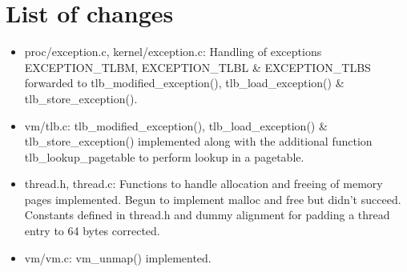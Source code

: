 \documentclass[11pt,a4paper]{article}
\begin{document}
\section{List of changes}
\begin{itemize}

    \item proc/exception.c, kernel/exception.c: Handling of exceptions
    EXCEPTION\_TLBM, EXCEPTION\_TLBL \& EXCEPTION\_TLBS forwarded to
    tlb\_modified\_exception(), tlb\_load\_exception() \&
    tlb\_store\_exception().

    \item vm/tlb.c: tlb\_modified\_exception(), tlb\_load\_exception() \&
    tlb\_store\_exception() implemented along with the additional function
    tlb\_lookup\_pagetable to perform lookup in a pagetable. 


    \item thread.h, thread.c: Functions to handle allocation and freeing of
    memory pages implemented. Begun to implement malloc and free but didn't
    succeed. Constants defined in thread.h and dummy alignment for padding a
    thread entry to 64 bytes corrected.

    \item vm/vm.c: vm\_unmap() implemented.

\end{itemize}
\end{document}
